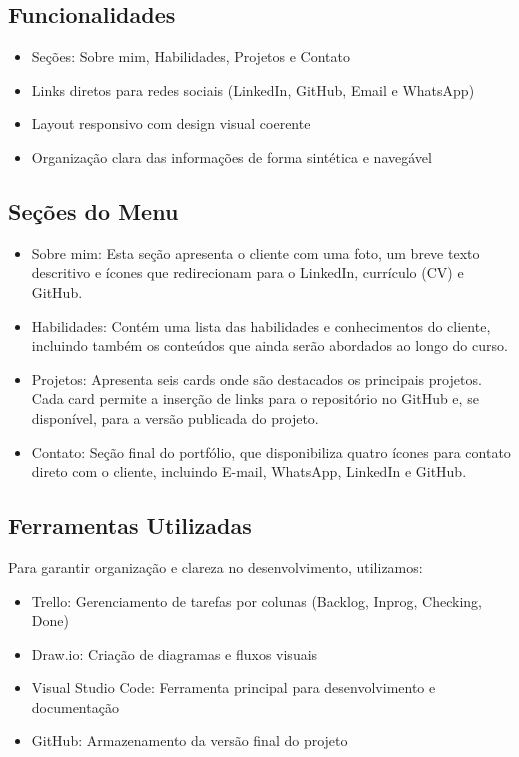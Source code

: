 \documentclass[12pt]{article}
\begin{document}
\subsection*{Funcionalidades}

\begin{itemize}
    \item Seções: Sobre mim, Habilidades, Projetos e Contato
    \item Links diretos para redes sociais (LinkedIn, GitHub, Email e WhatsApp)
    \item Layout responsivo com design visual coerente
    \item Organização clara das informações de forma sintética e navegável
\end{itemize}

\subsection*{Seções do Menu}

\begin{itemize}
    \item Sobre mim: Esta seção apresenta o cliente com uma foto, um breve texto descritivo e ícones que redirecionam para o LinkedIn, currículo (CV) e GitHub.
    \item Habilidades: Contém uma lista das habilidades e conhecimentos do cliente, incluindo também os conteúdos que ainda serão abordados ao longo do curso.
    \item Projetos: Apresenta seis cards onde são destacados os principais projetos. Cada card permite a inserção de links para o repositório no GitHub e, se disponível, para a versão publicada do projeto.
    \item Contato: Seção final do portfólio, que disponibiliza quatro ícones para contato direto com o cliente, incluindo E-mail, WhatsApp, LinkedIn e GitHub.
\end{itemize}

\subsection*{Ferramentas Utilizadas}

Para garantir organização e clareza no desenvolvimento, utilizamos:

\begin{itemize}
    \item Trello: Gerenciamento de tarefas por colunas (Backlog, Inprog, Checking, Done)
    \item Draw.io: Criação de diagramas e fluxos visuais
    \item Visual Studio Code: Ferramenta principal para desenvolvimento e documentação
    \item GitHub: Armazenamento da versão final do projeto
\end{itemize}
\end{document}
